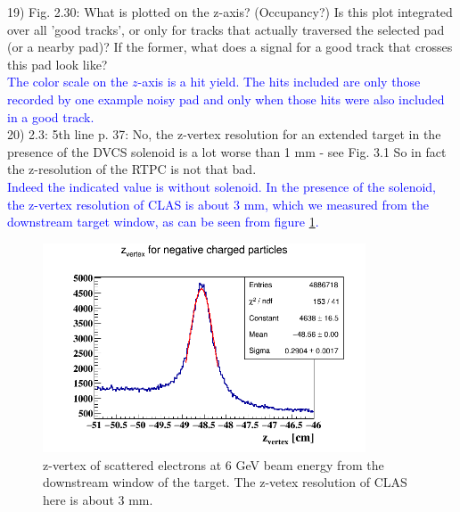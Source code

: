 19) Fig. 2.30: What is plotted on the z-axis? (Occupancy?) Is this plot 
integrated over all 'good tracks', or only for tracks that actually traversed 
the selected pad (or a nearby pad)? If the former, what does a signal for a 
good track that crosses this pad look like?\\
  \textcolor{blue}{The color scale on the $z$-axis is a hit yield. The
hits included are only those recorded by one example noisy pad and only when
those hits were also included in a good track.} \\


20) 2.3: 5th line p. 37: No, the z-vertex resolution for an extended target in 
the presence of the DVCS solenoid is a lot worse than 1 mm - see Fig. 3.1 So in 
fact the z-resolution of the RTPC is not that bad.\\
 \textcolor{blue}{Indeed the indicated value is without solenoid. In the presence of 
the solenoid, the z-vertex resolution of 
CLAS is about 3 mm, which we measured from the downstream target 
window, as can be seen from figure \ref{fig:z_electron_res}.}\\

\begin{figure}[tbp]
\centering
\includegraphics[height=6.2cm]{fig/clas_z_resolution.png}
\caption{ z-vertex of scattered electrons at 6 GeV beam energy from the 
downstream window of the target. The z-vetex resolution of CLAS here is about 3 
mm.}
\label{fig:z_electron_res}
\end{figure}


